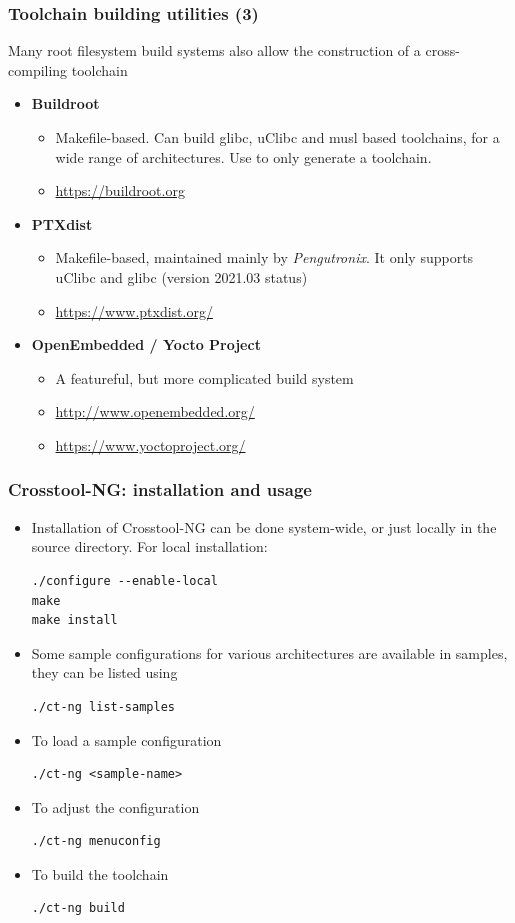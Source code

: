\begin{frame}
\frametitle{Toolchain building utilities (3)}
Many root filesystem build systems also allow the construction of
a cross-compiling toolchain
\begin{itemize}
\item {\bf Buildroot}
  \begin{itemize}
  \item Makefile-based. Can build glibc, uClibc and musl based
    toolchains, for a wide range of architectures. Use 
    to only generate a toolchain.
  \item \url{https://buildroot.org}
  \end{itemize}
\item {\bf PTXdist}
  \begin{itemize}
  \item Makefile-based, maintained mainly by {\em Pengutronix}. It only
        supports uClibc and glibc (version 2021.03 status)
  \item \url{https://www.ptxdist.org/}
  \end{itemize}
\item {\bf OpenEmbedded / Yocto Project}
  \begin{itemize}
  \item A featureful, but more complicated build system
  \item \url{http://www.openembedded.org/}
  \item \url{https://www.yoctoproject.org/}
  \end{itemize}
\end{itemize}
\end{frame}

\begin{frame}[fragile]
  \frametitle{Crosstool-NG: installation and usage}
  \begin{itemize}
  \item Installation of Crosstool-NG can be done system-wide, or just locally in
    the source directory. For local installation:
\begin{verbatim}
./configure --enable-local
make
make install
\end{verbatim}
  \item Some sample configurations for various architectures are
    available in
    samples, they can be listed using
\begin{verbatim}
./ct-ng list-samples
\end{verbatim}
  \item To load a sample configuration
\begin{verbatim}
./ct-ng <sample-name>
\end{verbatim}
  \item To adjust the configuration
\begin{verbatim}
./ct-ng menuconfig
\end{verbatim}
  \item To build the toolchain
\begin{verbatim}
./ct-ng build
\end{verbatim}
  \end{itemize}
\end{frame}


